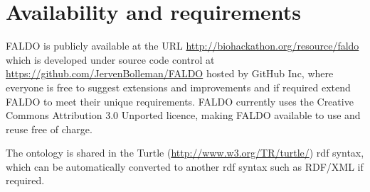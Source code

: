 \section*{Availability and requirements}
FALDO is publicly available at the URL \url{http://biohackathon.org/resource/faldo}
which is developed under source code control at
\url{https://github.com/JervenBolleman/FALDO} hosted by GitHub Inc,
where everyone is free to suggest extensions and improvements and if required extend FALDO to meet their unique requirements.
FALDO currently uses the Creative Commons Attribution 3.0 Unported licence,
making FALDO available to use and reuse free of charge.

The ontology is shared in the Turtle (\url{http://www.w3.org/TR/turtle/}) rdf syntax,
which can be automatically converted to another rdf syntax such as RDF/XML if required.